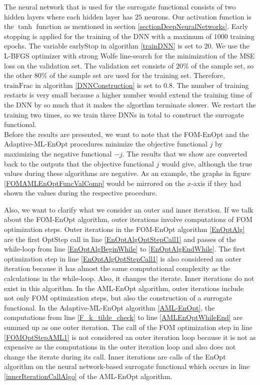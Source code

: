 The neural network that is used for the surrogate functional consists of two hidden layers where each hidden layer has $25$ neurons. Our activation function is the $\tanh$ function as mentioned in section \ref{sectionDeepNeuralNetworks}. Early stopping is applied for the training of the DNN with a maximum of $1000$ training epochs. The variable $\mathrm{earlyStop}$ in algorithm \ref{trainDNN} is set to $20$. We use the L-BFGS optimizer with strong Wolfe line-search for the minimization of the MSE loss on the validation set. The validation set consists of $20\%$ of the sample set, so the other $80\%$ of the sample set are used for the training set. Therefore, $\mathrm{trainFrac}$ in algorithm \ref{DNNConstruction} is set to $0.8$. The number of training restarts is very small because a higher number would extend the training time of the DNN by so much that it makes the algorthm terminate slower. We restart the training two times, so we train three DNNs in total to construct the surrogate functional.\\

Before the results are presented, we want to note that the FOM-EnOpt and the Adaptive-ML-EnOpt procedures minimize the objective functional $j$ by maximizing the negative functional $-j$. The results that we show are converted back to the outputs that the objective functional $j$ would give, although the true values during these algorithms are negative. As an example, the graphs in figure \ref{FOMAMLEnOptFuncValComp} would be mirrored on the $x$-axis if they had shown the values during the respective procedure.

Also, we want to clarify what we consider an outer and inner iteration. If we talk about the FOM-EnOpt algorithm, outer iterations involve computations of FOM optimization steps. Outer iterations in the FOM-EnOpt algorithm \ref{EnOptAlg} are the first OptStep call in line \ref{EnOptAlgOptStepCall1} and passes of the while-loop from line \ref{EnOptAlgBeginWhile} to \ref{EnOptAlgEndWhile}. The first optimization step in line \ref{EnOptAlgOptStepCall1} is also considered an outer iteration because it has almost the same computational complexity as the calculations in the while-loop. Also, it changes the iterate. Inner iterations do not exist in this algorithm. In the AML-EnOpt algorithm, outer iterations include not only FOM optimization steps, but also the construction of a surrogate functional. In the Adaptive-ML-EnOpt algorithm \ref{AML-EnOpt}, the computations from line \ref{F_k_tilde_check} to line \ref{AMLEnOptWhileEnd} are summed up as one outer iteration. The call of the FOM optimization step in line \ref{FOMOptStepAML1} is not considered an outer iteration loop because it is not as expensive as the computations in the outer iteration loop and also does not change the iterate during its call. Inner iterations are calls of the EnOpt algorithm on the neural network-based surrogate functional which occurs in line \ref{innerIterationCallAlgo} of the AML-EnOpt algorithm.

